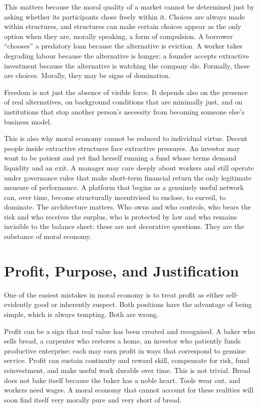 \documentclass[11pt,a4paper,oneside]{book}
\begin{document}
This matters because the moral quality of a market cannot be determined just by asking whether its participants chose freely within it. Choices are always made within structures, and structures can make certain choices appear as the only option when they are, morally speaking, a form of compulsion. A borrower ``chooses'' a predatory loan because the alternative is eviction. A worker takes degrading labour because the alternative is hunger; a founder accepts extractive investment because the alternative is watching the company die. Formally, these are choices. Morally, they may be signs of domination.

Freedom is not just the absence of visible force. It depends also on the presence of real alternatives, on background conditions that are minimally just, and on institutions that stop another person's necessity from becoming someone else's business model.

This is also why moral economy cannot be reduced to individual virtue. Decent people inside extractive structures face extractive pressures. An investor may want to be patient and yet find herself running a fund whose terms demand liquidity and an exit. A manager may care deeply about workers and still operate under governance rules that make short-term financial return the only legitimate measure of performance. A platform that begins as a genuinely useful network can, over time, become structurally incentivised to enclose, to surveil, to dominate. The architecture matters. Who owns and who controls, who bears the risk and who receives the surplus, who is protected by law and who remains invisible to the balance sheet: these are not decorative questions. They are the substance of moral economy.

\section*{Profit, Purpose, and Justification}

One of the easiest mistakes in moral economy is to treat profit as either self-evidently good or inherently suspect. Both positions have the advantage of being simple, which is always tempting. Both are wrong.

Profit can be a sign that real value has been created and recognised. A baker who sells bread, a carpenter who restores a home, an investor who patiently funds productive enterprise: each may earn profit in ways that correspond to genuine service. Profit can sustain continuity and reward skill, compensate for risk, fund reinvestment, and make useful work durable over time. This is not trivial. Bread does not bake itself because the baker has a noble heart. Tools wear out, and workers need wages. A moral economy that cannot account for these realities will soon find itself very morally pure and very short of bread.
\end{document}
